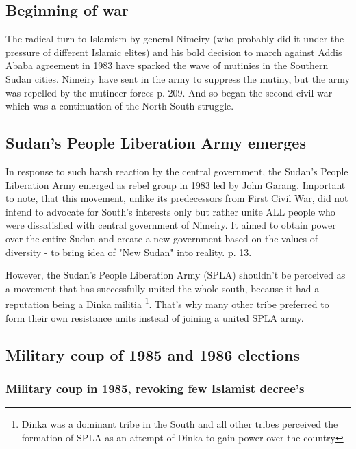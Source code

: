 \documentclass[14pt,a4paper]{article}
\begin{document}
\subsection{Beginning of war}

The radical turn to Islamism by general Nimeiry (who probably did it under the pressure of different Islamic elites) and his bold decision to march against Addis Ababa agreement in 1983 have sparked the wave of mutinies in the Southern Sudan cities. Nimeiry have sent in the army to suppress the mutiny, but the army was repelled by the mutineer forces \cite{johnson2003root} p. 209. And so began the second civil war which was a continuation of the North-South struggle. 

\subsection{Sudan's People Liberation Army emerges}

In response to such harsh reaction by the central government, the Sudan's People Liberation Army emerged as rebel group in 1983 led by John Garang. Important to note, that this movement, unlike its predecessors from First Civil War, did not intend to advocate for South's interests only but rather unite ALL people who were dissatisfied with central government of Nimeiry. It aimed to obtain power over the entire Sudan and create a new government based on the values of diversity - to bring idea of "New Sudan" into reality. \cite{raftopoulos2006peace} p. 13. 

However, the Sudan's People Liberation Army (SPLA) shouldn't be perceived as a movement that has successfully united the whole south, because it had a reputation being a Dinka militia \footnote{Dinka was a dominant tribe in the South and all other tribes perceived the formation of SPLA as an attempt of Dinka to gain power over the country}. That's why many other tribe preferred to form their own resistance units instead of joining a united SPLA army. 

\subsection{Military coup of 1985 and 1986 elections}

\subsubsection{Military coup in 1985, revoking few Islamist decree's}
\end{document}
